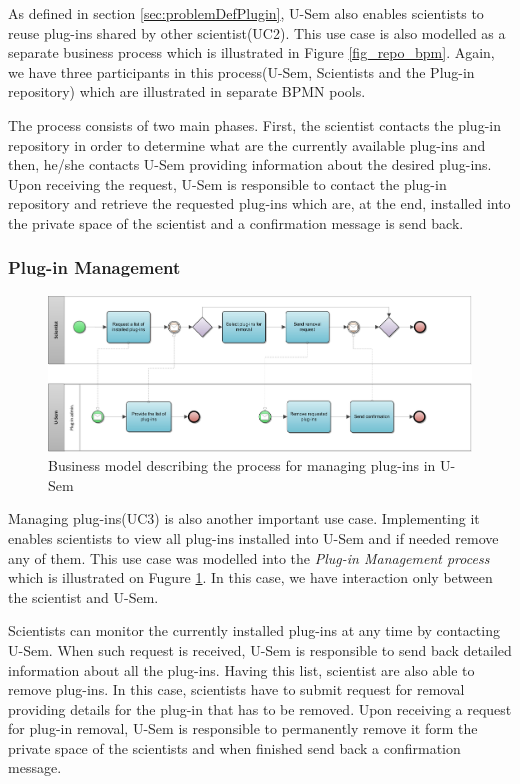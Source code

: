 As defined in section \ref{sec:problemDefPlugin}, U-Sem also enables scientists to reuse plug-ins shared by other scientist(UC2). This use case is also modelled as a separate business process which is illustrated in Figure \ref{fig_repo_bpm}. Again, we have three participants in this process(U-Sem, Scientists and the Plug-in repository) which are illustrated in separate BPMN pools. 

The process consists of two main phases. First, the scientist contacts the plug-in repository in order to determine what are the currently available plug-ins and then, he/she contacts U-Sem providing information about the desired plug-ins. Upon receiving the request, U-Sem is responsible to contact the plug-in repository and retrieve the requested plug-ins which are, at the end, installed into the private space of the scientist and a confirmation message is send back.

\subsubsection{Plug-in Management}

\begin{figure}[h!]
  \centering
  	\includegraphics[scale=0.7,angle=90]{plug-in/business_processes/PluginManagementBusinessModel.jpg}
  \caption{Business model describing the process for managing plug-ins in U-Sem}
  \label{fig_admin_bpm}
\end{figure}

Managing plug-ins(UC3) is also another important use case. Implementing it enables scientists to view all plug-ins installed into U-Sem and if needed remove any of them. This use case was modelled into the \textit{Plug-in Management process} which is illustrated on Fugure \ref{fig_admin_bpm}. In this case, we have interaction only between the scientist and U-Sem.

Scientists can monitor the currently installed plug-ins at any time by contacting U-Sem. When such request is received, U-Sem is responsible to send back detailed information about all the plug-ins. Having this list, scientist are also able to remove plug-ins. In this case, scientists have to submit request for removal providing details for the plug-in that has to be removed. Upon receiving a request for plug-in removal, U-Sem is responsible to permanently remove it form the private space of the scientists and when finished send back a confirmation message.


